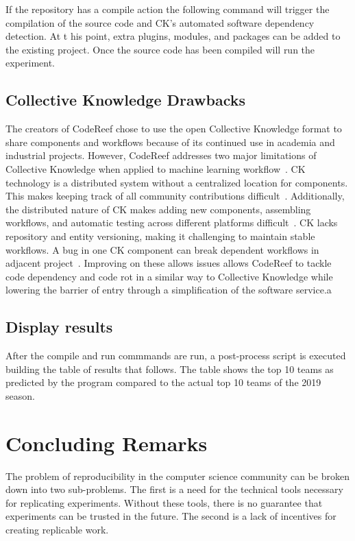 \documentclass{IEEEtran}
\begin{document}
If the repository has a compile action the following command will trigger the compilation of the source code and CK’s automated software dependency detection. At t his point, extra plugins, modules, and packages can be added to the existing project. Once the source code has been compiled  will run the experiment.

\subsection{Collective Knowledge Drawbacks}
The creators of CodeReef chose to use the open Collective Knowledge format to share components and workflows because of its continued use in academia and industrial projects. However, CodeReef addresses two major limitations of Collective Knowledge when applied to machine learning workflow~\cite{CROP}.
CK technology is a distributed system without a centralized location for components. This makes keeping track of all community contributions difficult~\cite{CROP}. Additionally, the distributed nature of CK makes adding new components, assembling workflows, and automatic testing across different platforms difficult~\cite{CROP}. 
CK lacks repository and entity versioning, making it challenging to maintain stable workflows. A bug in one CK component can break dependent workflows in adjacent project~\cite{CROP}.
Improving on these allows issues allows CodeReef to tackle code dependency and code rot in a similar way to Collective Knowledge while lowering the barrier of entry through a simplification of the software service.a

\subsection{Display results}
After the compile and run commmands are run, a post-process script is executed building the table of results that follows. The table shows the top 10 teams as predicted by the program compared to the actual top 10 teams of the 2019 season.




\section{Concluding Remarks}
The problem of reproducibility in the computer science community can be broken down into two sub-problems. The first is a need for the technical tools necessary for replicating experiments. Without these tools, there is no guarantee that experiments can be trusted in the future. The second is a lack of incentives for creating replicable work.
\end{document}
